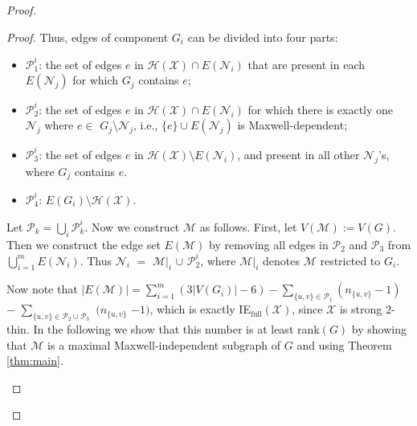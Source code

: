 \documentclass[10pt]{article}
\def\M{\mathcal {M}}
\def\N{\mathcal {N}}
\def\H{\mathcal {H}}
\def\X{\mathcal {X}}
\def\P{\mathscr{P}}
\begin{document}
\begin{proof}
\begin{proof}
\medskip
\noindent Thus, edges of component $G_i$ can be divided into four parts:
\begin{itemize}
\item $\P_1^i$: the set of edges $e$ in $\H(\X)\cap E(\N_i)$ that are present in each $E(\N_j)$ for which $G_j$ contains $e$;
\item $\P_2^i$: the set of edges $e$ in $\H(\X)\cap E(\N_i)$ for which there is exactly one $\N_j$ where $e\in$ $G_j\setminus \N_j$, i.e., $ \{e\} \cup E(\N_j)$ is Maxwell-dependent;
\item $\P_3^i$: the set of edges $e$ in $\H(\X)\setminus E(\N_i)$, and present in all other $\N_j$'s, where $G_j$ contains $e$.
\item $\P_4^i$: $E(G_i)\setminus \H(\X)$.
\end{itemize}

\begin{comment}
\begin{center}
\begin{figure}[h]
\begin{center}
\psfrag{Ci}{\huge $G_i$}\psfrag{P1}{\huge $\P_1^i$}\psfrag{P2}{\huge
$\P_2^i$}\psfrag{P3}{\huge $\P_3^i$}\psfrag{P4}{\huge $\P_4^i$}
\texttt{[image: four\_part]}
\end{center}
\caption{Illustration of 4 parts of edges in $G_i$ in the proof of Theorem \ref{thm:complete2thin}: the solid lines inside the circle
represent the edges that are in $\N_i$, and the dashed lines inside the circle
represent edges that are not in $\N_i$ but in $G_i$. The solid lines outside the circle are present in all (other) $\N_j$'s where $G_j$ contains $e$. The dashed lines outside the circle are edges that are absent in exactly one $\N_j$ $\neq$ $\N_i$.}
\label{four_part}
\end{figure}
\end{center}
\end{comment}


Let $\P_k= \bigcup\limits_{i} \P_k^i$. Now we construct $\M$ as follows. First, let $V(\M):= V(G)$. Then we construct the edge set $E(\M)$ by removing all edges in $\P_2$ and $\P_3$ from $\bigcup\limits_{i=1}^m E(\N_i)$. Thus $\N_i$ $=$ $\M|_i$ $\cup$ $\P_2^i$, where $\M|_i$ denotes $\M$ restricted to $G_i$.

Now note that $|E(\M)| = \sum\limits_{i=1}^m (3|V(G_i)| - 6)
-\sum\limits_{{\{u, v\}}\in \P_1} (n_{\{u, v\}} -1)$ $-$ $\sum\limits_{{\{u, v\}}\in \P_2\cup \P_3}$ $(n_{\{u, v\}}$ $-1)$, which is exactly IE$_{\text{full}}(\X)$, since $\X$ is strong $2$-thin.
In the following we show that this number is at least rank$(G)$ by showing that $\M$ is a maximal Maxwell-independent subgraph of $G$ and using Theorem \ref{thm:main}.
\begin{enumerate}[(I)]


\end{enumerate}
\end{proof}
\end{proof}
\end{document}
